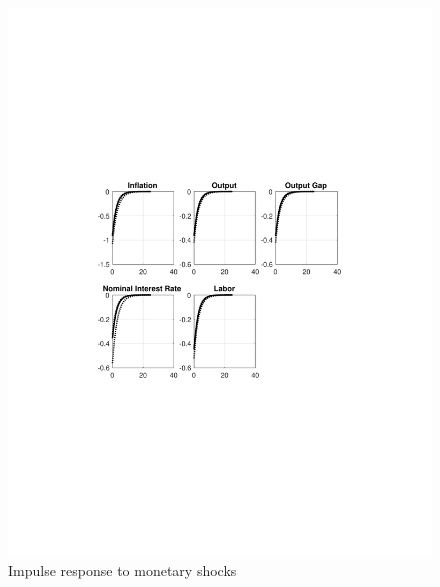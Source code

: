 \documentclass[12pt]{article}
\theoremstyle{definition}
\begin{document}
\begin{figure}[H]
	\centering
	\includegraphics[width=\linewidth, height = 0.4\textheight]{impulse_monetary}
	\caption{Impulse response to monetary shocks}
	\label{fig:impulse_monetary}
\end{figure}
\end{document}
